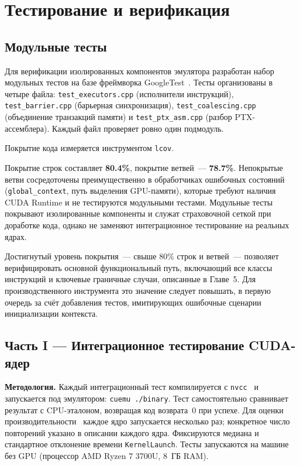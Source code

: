 \section{Тестирование и верификация}

\subsection{Модульные тесты}

Для верификации изолированных компонентов эмулятора разработан
набор модульных тестов на базе фреймворка GoogleTest~\cite{GoogleTest}. Тесты
организованы в четыре файла: \texttt{test\_executors.cpp}
(исполнители инструкций), \texttt{test\_barrier.cpp} (барьерная синхронизация),
\texttt{test\_coalescing.cpp} (объединение транзакций памяти)
и \texttt{test\_ptx\_asm.cpp} (разбор PTX-ассемблера).
Каждый файл проверяет ровно один подмодуль.

Покрытие кода измеряется инструментом \texttt{lcov}.

Покрытие строк составляет \textbf{80.4\%}, покрытие ветвей~--- \textbf{78.7\%}.
Непокрытые ветви сосредоточены преимущественно в обработчиках ошибочных
состояний (\texttt{global\_context}, путь выделения GPU-памяти),
которые требуют наличия CUDA Runtime и не тестируются модульными тестами.
Модульные тесты покрывают изолированные компоненты и служат
страховочной сеткой при доработке кода, однако не заменяют интеграционное
тестирование на реальных ядрах.

Достигнутый уровень покрытия~--- свыше 80\% строк и ветвей~--- позволяет верифицировать основной функциональный путь,
включающий все классы инструкций и ключевые граничные случаи,
описанные в Главе~5. Для производственного инструмента это значение
следует повышать, в первую очередь за счёт добавления тестов,
имитирующих ошибочные сценарии инициализации контекста.

\subsection{Часть I --- Интеграционное тестирование CUDA-ядер}

\textbf{Методология.} Каждый интеграционный тест компилируется
с \texttt{nvcc}~\cite{NVCC} и запускается под эмулятором: \texttt{cuemu ./binary}.
Тест самостоятельно сравнивает результат с CPU-эталоном, возвращая
код возврата~0 при успехе. Для оценки производительности~
каждое ядро запускается несколько раз; конкретное число повторений
указано в описании каждого ядра. Фиксируются медиана и стандартное
отклонение времени \texttt{KernelLaunch}. Тесты запускаются на машине без GPU
(процессор AMD Ryzen 7 3700U, 8~ГБ RAM).

